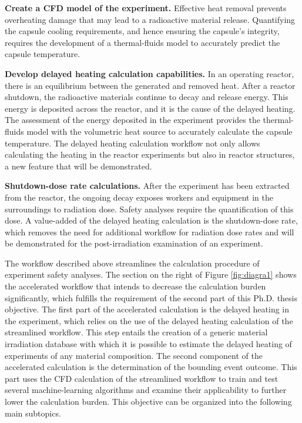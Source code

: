 \textbf{Create a CFD model of the experiment.}
Effective heat removal prevents overheating damage that may lead to a radioactive material release.
Quantifying the capsule cooling requirements, and hence ensuring the capsule's integrity, requires the development of a thermal-fluids model to accurately predict the capsule temperature.

\textbf{Develop delayed heating calculation capabilities.}
In an operating reactor, there is an equilibrium between the generated and removed heat.
After a reactor shutdown, the radioactive materials continue to decay and release energy.
This energy is deposited across the reactor, and it is the cause of the delayed heating.
The assessment of the energy deposited in the experiment provides the thermal-fluids model with the volumetric heat source to accurately calculate the capsule temperature.
The delayed heating calculation workflow not only allows calculating the heating in the reactor experiments but also in reactor structures, a new feature that will be demonstrated.

\textbf{Shutdown-dose rate calculations.}
After the experiment has been extracted from the reactor, the ongoing decay exposes workers and equipment in the surroundings to radiation dose.
Safety analyses require the quantification of this dose.
A value-added of the delayed heating calculation is the shutdown-dose rate, which removes the need for additional workflow for radiation dose rates and will be demonstrated for the post-irradiation examination of an experiment.

The workflow described above streamlines the calculation procedure of experiment safety analyses.
The section on the right of Figure \ref{fig:diagra1} shows the accelerated workflow that intends to decrease the calculation burden significantly, which fulfills the requirement of the second part of this Ph.D. thesis objective.
The first part of the accelerated calculation is the delayed heating in the experiment, which relies on the use of the delayed heating calculation of the streamlined workflow.
This step entails the creation of a generic material irradiation database with which it is possible to estimate the delayed heating of experiments of any material composition.
The second component of the accelerated calculation is the determination of the bounding event outcome.
This part uses the CFD calculation of the streamlined workflow to train and test several machine-learning algorithms and examine their applicability to further lower the calculation burden.
This objective can be organized into the following main subtopics.

